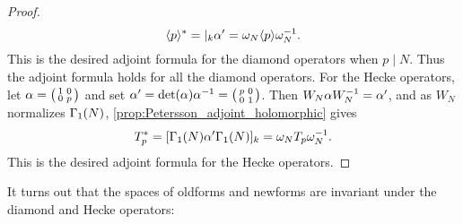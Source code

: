 \begin{proof}
      \[
        \langle p\rangle^{\ast} = |_{k}\alpha' = \omega_{N}\langle p\rangle\omega_{N}^{-1}.
      \]
      This is the desired adjoint formula for the diamond operators when $p \mid N$. Thus the adjoint formula holds for all the diamond operators. For the Hecke operators, let $\alpha = \begin{psmallmatrix}1 & 0 \\ 0 & p\end{psmallmatrix}$ and set $\alpha' = \det(\alpha)\alpha^{-1} = \begin{psmallmatrix} p & 0 \\ 0 & 1\end{psmallmatrix}$. Then $W_{N}\alpha W_{N}^{-1} = \alpha'$, and as $W_{N}$ normalizes $\Gamma_{1}(N)$, \cref{prop:Petersson_adjoint_holomorphic} gives
      \[
        T_{p}^{\ast} = [\Gamma_{1}(N)\alpha'\Gamma_{1}(N)]_{k} = \omega_{N}T_{p}\omega_{N}^{-1}.
      \]
      This is the desired adjoint formula for the Hecke operators.
    \end{proof}
    
    It turns out that the spaces of oldforms and newforms are invariant under the diamond and Hecke operators:

